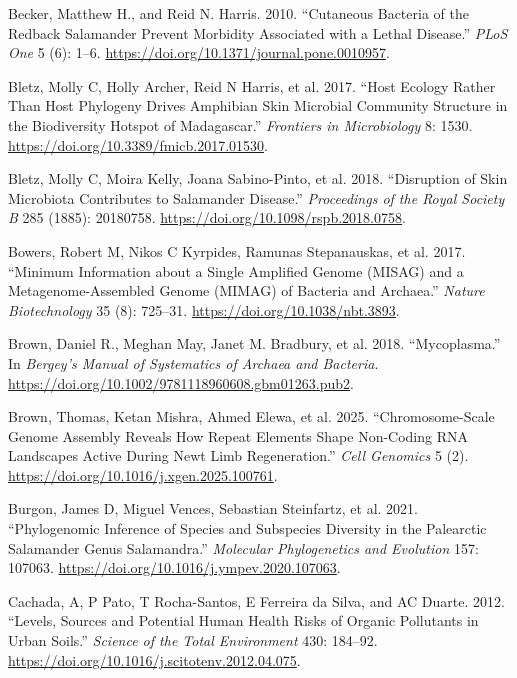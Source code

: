\documentclass[
  12pt,
]{article}
\newlength{\cslhangindent}
\newenvironment{CSLReferences}[2] %
 {\begin{list}{}{%
  \setlength{\itemindent}{0pt}
  \setlength{\leftmargin}{0pt}
  \setlength{\parsep}{0pt}
  \ifodd #1
   \setlength{\leftmargin}{\cslhangindent}
   \setlength{\itemindent}{-1\cslhangindent}
  \fi
  \setlength{\itemsep}{#2\baselineskip}}}
 {\end{list}}
\begin{document}
\begin{CSLReferences}{1}{1}
Becker, Matthew H., and Reid N. Harris. 2010. {``Cutaneous {Bacteria} of
the {Redback} {Salamander} {Prevent} {Morbidity} {Associated} with a
{Lethal} {Disease}.''} \emph{PLoS One} 5 (6): 1--6.
\url{https://doi.org/10.1371/journal.pone.0010957}.

Bletz, Molly C, Holly Archer, Reid N Harris, et al. 2017. {``Host
Ecology Rather Than Host Phylogeny Drives Amphibian Skin Microbial
Community Structure in the Biodiversity Hotspot of {Madagascar}.''}
\emph{Frontiers in Microbiology} 8: 1530.
\url{https://doi.org/10.3389/fmicb.2017.01530}.

{Bletz, Molly C, Moira Kelly, Joana Sabino-Pinto, et al.} 2018.
{``Disruption of Skin Microbiota Contributes to Salamander Disease.''}
\emph{Proceedings of the Royal Society B} 285 (1885): 20180758.
\url{https://doi.org/10.1098/rspb.2018.0758}.

{Bowers, Robert M, Nikos C Kyrpides, Ramunas Stepanauskas, et al.} 2017.
{``Minimum Information about a Single Amplified Genome ({MISAG}) and a
Metagenome-Assembled Genome ({MIMAG}) of Bacteria and Archaea.''}
\emph{Nature Biotechnology} 35 (8): 725--31.
\url{https://doi.org/10.1038/nbt.3893}.

Brown, Daniel R., Meghan May, Janet M. Bradbury, et al. 2018.
{``Mycoplasma.''} In \emph{Bergey's {Manual} of {Systematics} of
{Archaea} and {Bacteria}}.
\url{https://doi.org/10.1002/9781118960608.gbm01263.pub2}.

{Brown, Thomas, Ketan Mishra, Ahmed Elewa, et al.} 2025.
{``Chromosome-Scale Genome Assembly Reveals How Repeat Elements Shape
Non-Coding {RNA} Landscapes Active During Newt Limb Regeneration.''}
\emph{Cell Genomics} 5 (2).
\url{https://doi.org/10.1016/j.xgen.2025.100761}.

{Burgon, James D, Miguel Vences, Sebastian Steinfartz, et al.} 2021.
{``Phylogenomic Inference of Species and Subspecies Diversity in the
{Palearctic} Salamander Genus {Salamandra}.''} \emph{Molecular
Phylogenetics and Evolution} 157: 107063.
\url{https://doi.org/10.1016/j.ympev.2020.107063}.

Cachada, A, P Pato, T Rocha-Santos, E Ferreira da Silva, and AC Duarte.
2012. {``Levels, Sources and Potential Human Health Risks of Organic
Pollutants in Urban Soils.''} \emph{Science of the Total Environment}
430: 184--92. \url{https://doi.org/10.1016/j.scitotenv.2012.04.075}.


\end{CSLReferences}
\end{document}
